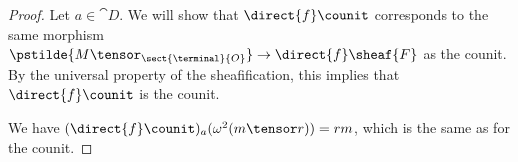 
\begin{proof}
Let $a\in\cat{D}$.
We will show that $\direct{f}\counit$ corresponds to the same
morphism $\pstilde{M\tensor_{\sect{\terminal}{O}}} \rightarrow \direct{f}\sheaf{F}$
as the counit. By the universal property of  the sheafification, this implies that $\direct{f}\counit$ is the counit.

We have
$(\direct{f}\counit)_a (\omega^2(m\tensor r)) = rm$, which is the same as for the counit.
\end{proof}